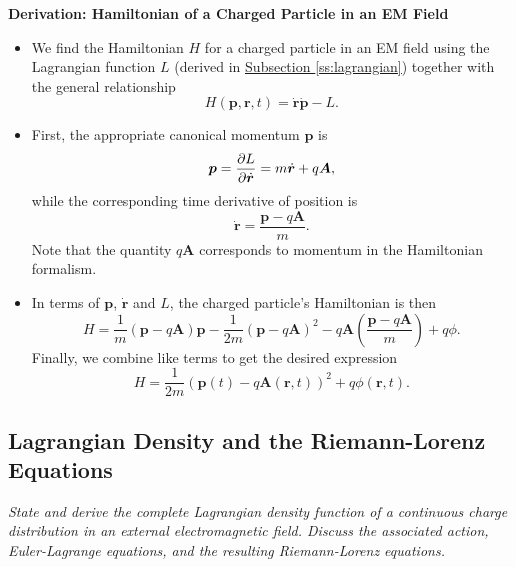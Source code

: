 \documentclass[11pt, a4paper]{article}
\renewcommand{\vec}[1]{\bm{#1}} %
\renewcommand{\r}{\vec{r}}
\newcommand{\A}{\vec{A}} %
\begin{document}
\textbf{Derivation: Hamiltonian of a Charged Particle in an EM Field}
\begin{itemize}
    \item We find the Hamiltonian $ H $ for a charged particle in an EM field using the Lagrangian function $ L $ (derived in \hyperref[ss:lagrangian]{\underline{Subsection \ref{ss:lagrangian}}}) together with the general relationship
    \begin{equation*}
        H( \vec{p}, \vec{r}, t) = \dot{\vec{r}} \dot{\vec{p}} - L.
    \end{equation*}
    
    \item First, the appropriate canonical momentum $ \vec{p} $ is
    \begin{equation*}
        \vec{p} = \pdv{L}{ \dot{\vec{r}}} = m \dot{\vec{r}} + q \A,
    \end{equation*}
    while the corresponding time derivative of position is
    \begin{equation*}
        \dot{\vec{r}} = \frac{\vec{p} - q\A}{m}.
    \end{equation*}
    Note that the quantity $ q \A $ corresponds to momentum in the Hamiltonian formalism. 

    \item In terms of $ \vec{p} $, $ \dot{\vec{r}} $ and $ L $, the charged particle's Hamiltonian is then
    \begin{equation*}
        H = \frac{1}{m} ( \vec{p} - q\A) \vec{p} - \frac{1}{2m} ( \vec{p} - q\A)^{2} - q\A \left( \frac{ \vec{p} - q \A}{m} \right) + q \phi.
    \end{equation*}
    Finally, we combine like terms to get the desired expression
    \begin{equation*}
        H = \frac{1}{2m}( \vec{p}(t) - q\A (\r, t))^{2} + q \phi(\r, t).
    \end{equation*}
    
\end{itemize}
    

\subsection{Lagrangian Density and the Riemann-Lorenz Equations} \label{ss:lagrange-density}
\textit{State and derive the complete Lagrangian density function of a continuous charge distribution in an external electromagnetic field. Discuss the associated action, Euler-Lagrange equations, and the resulting Riemann-Lorenz equations.}
\end{document}
